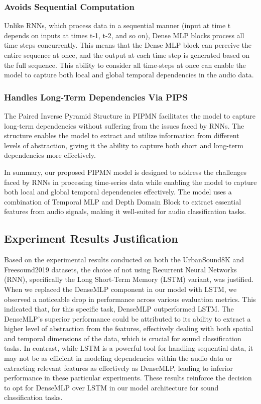 \documentclass[runningheads]{llncs}
\begin{document}
\subsubsection{Avoids Sequential Computation}

Unlike RNNs, which process data in a sequential manner (input at time t depends on inputs at times t-1, t-2, and so on), Dense MLP blocks process all time steps concurrently. This means that the Dense MLP block can perceive the entire sequence at once, and the output at each time step is generated based on the full sequence. This ability to consider all time-steps at once can enable the model to capture both local and global temporal dependencies in the audio data.

\subsubsection{Handles Long-Term Dependencies Via PIPS}

The Paired Inverse Pyramid Structure in PIPMN facilitates the model to capture long-term dependencies without suffering from the issues faced by RNNs. The structure enables the model to extract and utilize information from different levels of abstraction, giving it the ability to capture both short and long-term dependencies more effectively.

In summary, our proposed PIPMN model is designed to address the challenges faced by RNNs in processing time-series data while enabling the model to capture both local and global temporal dependencies effectively. The model uses a combination of Temporal MLP and Depth Domain Block to extract essential features from audio signals, making it well-suited for audio classification tasks.

\subsection{Experiment Results Justification}

Based on the experimental results conducted on both the UrbanSound8K and Freesound2019 datasets, the choice of not using Recurrent Neural Networks (RNN), specifically the Long Short-Term Memory (LSTM) variant, was justified. When we replaced the DenseMLP component in our model with LSTM, we observed a noticeable drop in performance across various evaluation metrics. This indicated that, for this specific task, DenseMLP outperformed LSTM. The DenseMLP's superior performance could be attributed to its ability to extract a higher level of abstraction from the features, effectively dealing with both spatial and temporal dimensions of the data, which is crucial for sound classification tasks. In contrast, while LSTM is a powerful tool for handling sequential data, it may not be as efficient in modeling dependencies within the audio data or extracting relevant features as effectively as DenseMLP, leading to inferior performance in these particular experiments. These results reinforce the decision to opt for DenseMLP over LSTM in our model architecture for sound classification tasks.
\end{document}
